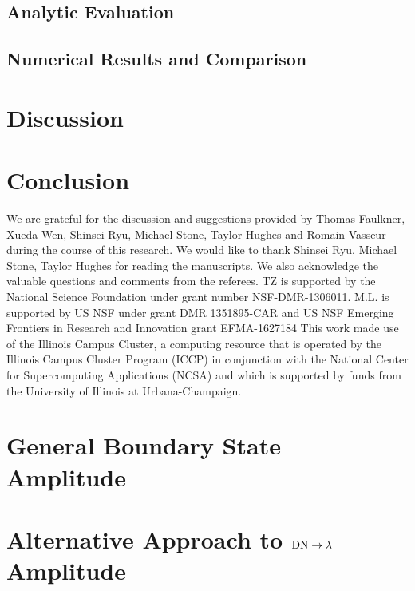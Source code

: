 \documentclass[reprint, prb]{revtex4-1}
\begin{document}
\subsection{Analytic Evaluation}
\label{sec_sub:analy_eval}


\subsection{Numerical Results and Comparison}


\section{Discussion}
\label{sec:disc}


\section{Conclusion}
\label{sec:conclusion}



\begin{acknowledgments}
We are grateful for the discussion and suggestions provided by Thomas Faulkner, Xueda Wen, Shinsei Ryu, Michael Stone, Taylor Hughes and Romain Vasseur during the course of this research. We would like to thank Shinsei Ryu, Michael Stone, Taylor Hughes for reading the manuscripts. We also acknowledge the valuable questions and comments from the referees. 
TZ is supported by the National Science Foundation under grant number NSF-DMR-1306011.
M.L. is supported by US NSF under grant DMR 1351895-CAR and US NSF Emerging Frontiers in Research and Innovation grant EFMA-1627184
This work made use of the Illinois Campus Cluster, a computing resource that is operated by the Illinois Campus Cluster Program (ICCP) in conjunction with the National Center for Supercomputing Applications (NCSA) and which is supported by funds from the University of Illinois at Urbana-Champaign.
\end{acknowledgments}

\appendix

\section{General Boundary State Amplitude}
\label{app:lambda_12}


\section{Alternative Approach to ${\rm DN} \rightarrow \lambda$ Amplitude}
\label{app:gnd_dn_lambda}

\end{document}

